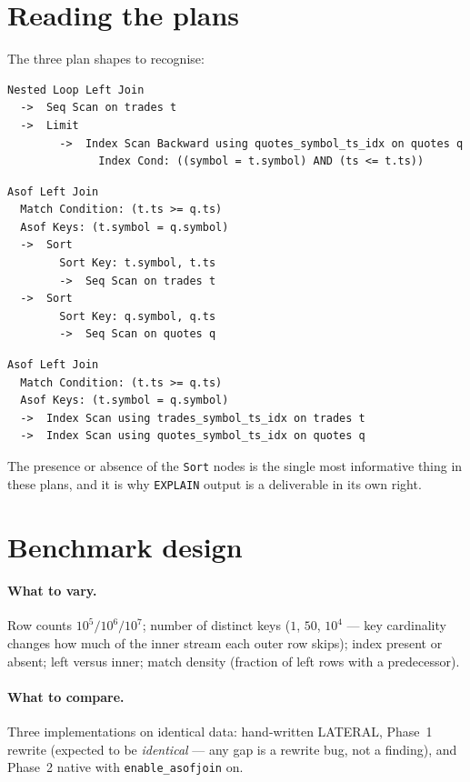 \documentclass[11pt,a4paper]{report}
\theoremstyle{definition}
\theoremstyle{plain}
\newcommand{\code}[1]{\texttt{\small #1}}
\begin{document}
\section{Reading the plans}

The three plan shapes to recognise:

\begin{lstlisting}[style=plain,caption={LATERAL workaround --- per-row index descent.},captionpos=b]
Nested Loop Left Join
  ->  Seq Scan on trades t
  ->  Limit
        ->  Index Scan Backward using quotes_symbol_ts_idx on quotes q
              Index Cond: ((symbol = t.symbol) AND (ts <= t.ts))
\end{lstlisting}

\begin{lstlisting}[style=plain,caption={Native, inputs not presorted --- two sorts, one pass.},captionpos=b]
Asof Left Join
  Match Condition: (t.ts >= q.ts)
  Asof Keys: (t.symbol = q.symbol)
  ->  Sort
        Sort Key: t.symbol, t.ts
        ->  Seq Scan on trades t
  ->  Sort
        Sort Key: q.symbol, q.ts
        ->  Seq Scan on quotes q
\end{lstlisting}

\begin{lstlisting}[style=plain,caption={Native, indexes supply the order --- the goal.},captionpos=b]
Asof Left Join
  Match Condition: (t.ts >= q.ts)
  Asof Keys: (t.symbol = q.symbol)
  ->  Index Scan using trades_symbol_ts_idx on trades t
  ->  Index Scan using quotes_symbol_ts_idx on quotes q
\end{lstlisting}

The presence or absence of the \code{Sort} nodes is the single most informative thing in
these plans, and it is why \code{EXPLAIN} output is a deliverable in its own right.

\section{Benchmark design}

\paragraph{What to vary.} Row counts $10^5 / 10^6 / 10^7$; number of distinct keys
($1$, $50$, $10^4$ --- key cardinality changes how much of the inner stream each outer row
skips); index present or absent; left versus inner; match density (fraction of left rows
with a predecessor).

\paragraph{What to compare.} Three implementations on identical data: hand-written LATERAL,
Phase~1 rewrite (expected to be \emph{identical} --- any gap is a rewrite bug, not a
finding), and Phase~2 native with \code{enable\_asofjoin} on.
\end{document}
